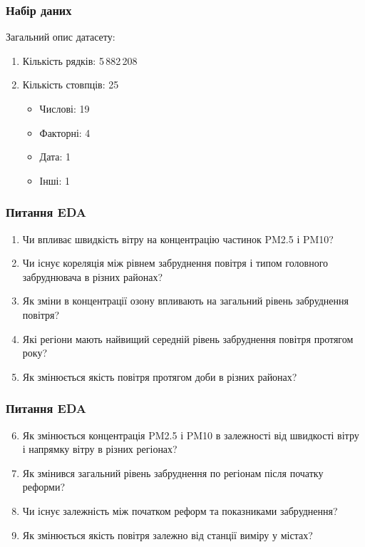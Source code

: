 \documentclass{beamer}
\begin{document}
\begin{frame}
  \frametitle{Набір даних}

  Загальний опис датасету:

  \begin{enumerate}
    \item Кількість рядків: 5\,882\,208
    \item Кількість стовпців: 25

    \begin{itemize}
      \item Числові: 19
      \item Факторні: 4
      \item Дата: 1
      \item Інші: 1
    \end{itemize}
  \end{enumerate}
\end{frame}

\begin{frame}
  \frametitle{Питання EDA}

  \begin{enumerate}
    \item Чи впливає швидкість вітру на концентрацію частинок PM2.5 і PM10?
    \item Чи існує кореляція між рівнем забруднення повітря і типом головного забруднювача
    в різних районах?
    \item Як зміни в концентрації озону  впливають на загальний рівень забруднення повітря?
    \item Які регіони мають найвищий середній рівень забруднення повітря протягом року?
    \item Як змінюється якість повітря протягом доби в різних районах?
  \end{enumerate}
\end{frame}

\begin{frame}
  \frametitle{Питання EDA}

  \begin{enumerate}
    \setcounter{enumi}{5}

    \item Як змінюється концентрація PM2.5 і PM10 в залежності від швидкості вітру і напрямку вітру
    в різних регіонах?
    \item Як змінився загальний рівень забруднення по регіонам після початку реформи?
    \item Чи існує залежність між початком реформ та показниками забруднення?
    \item Як змінюється якість повітря залежно від станції виміру у містах?
  \end{enumerate}
\end{frame}
\end{document}
